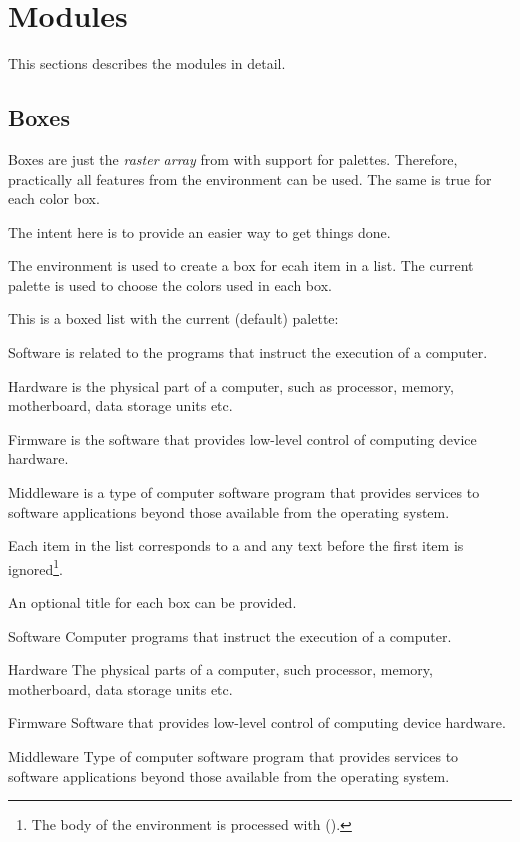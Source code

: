 \documentclass[a4paper, 11pt]{article}
\begin{document}
\section{Modules}

This sections describes the modules in detail.

\subsection{Boxes}\label{sec:boxes}

Boxes are just the \textit{raster array} from  with support for palettes. Therefore, practically all features from the  environment can be used. The same is true for each color box.

The intent here is to provide an easier way to get things done.

The environment  is used to create a box for ecah item in a list. The current palette is used to choose the colors used in each box.

\begin{example}{}
    This is a boxed list with the current (default) palette:

    \begin{PLTBoxRaster}
        \item Software is related to the programs that instruct the execution of a computer.
        \item Hardware is the physical part of a computer, such as processor, memory, motherboard, data storage units etc.
        \item Firmware is the software that provides low-level control of computing device hardware.
        \item Middleware is a type of computer software program that provides services to software applications beyond those available from the operating system.
    \end{PLTBoxRaster}
\end{example}

Each item in the list corresponds to a  and any text before the first item is ignored\footnote{The body of the environment is processed with  ().}.

An optional title for each box can be provided.

\begin{example}{}
    \begin{PLTBoxRaster}
        \item[Software] Computer programs that instruct the execution of a computer.
        \item[Hardware] The physical parts of a computer, such processor, memory, motherboard, data storage units etc.
        \item[Firmware] Software that provides low-level control of computing device hardware.
        \item[Middleware] Type of computer software program that provides services to software applications beyond those available from the operating system.
    \end{PLTBoxRaster}
\end{example}
\end{document}
